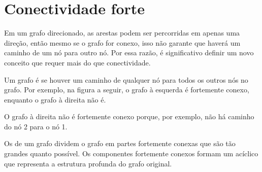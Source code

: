 \chapter{Conectividade forte}


Em um grafo direcionado,
as arestas podem ser percorridas em apenas uma direção,
então mesmo se o grafo for conexo,
isso não garante que haverá
um caminho de um nó para outro nó.
Por essa razão, é significativo definir um novo conceito
que requer mais do que conectividade.

Um grafo é 
se houver um caminho de qualquer nó para todos
os outros nós no grafo.
Por exemplo, na figura a seguir,
o grafo à esquerda é fortemente conexo,
enquanto o grafo à direita não é.

\begin{center}
\end{center}

O grafo à direita não é fortemente conexo
porque, por exemplo, não há caminho
do nó 2 para o nó 1.


Os 
de um grafo dividem o grafo em partes fortemente conexas
que são tão grandes quanto possível.
Os componentes fortemente conexos formam um
 acíclico que representa
a estrutura profunda do grafo original.

